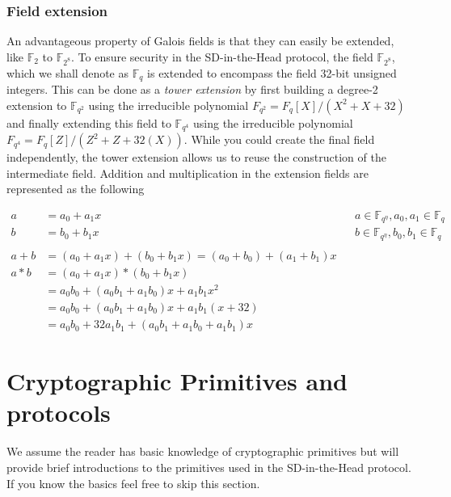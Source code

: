 \documentclass[twoside,11pt]{report}
\theoremstyle{definition}
\theoremstyle{plain}
\begin{document}
\subsubsection{Field extension}

An advantageous property of Galois fields is that they can easily be extended, like $\mathbb{F}_{2}$ to $\mathbb{F}_{2^8}$. To ensure security in the SD-in-the-Head protocol, the field $\mathbb{F}_{2^8}$, which we shall denote as $\mathbb{F}_q$ is extended to encompass the field 32-bit unsigned integers. This can be done as a \textit{tower extension} by first building a degree-2 extension to $\mathbb{F}_{q^2}$ using the irreducible polynomial $F_{q^2} = F_q[X] / (X^2 + X + 32)$ and finally extending this field to $\mathbb{F}_{q^4}$ using the irreducible polynomial $F_{q^4} = F_q[Z] / (Z^2 + Z + 32(X))$. While you could create the final field independently, the tower extension allows us to reuse the construction of the intermediate field. Addition and multiplication in the extension fields are represented as the following

\begin{align*}
  a     & = a_0 + a_1x                                               &  & a \in \mathbb{F}_{q^\eta}, a_0, a_1 \in \mathbb{F}_q \\
  b     & = b_0 + b_1x                                               &  & b \in \mathbb{F}_{q^\eta}, b_0, b_1 \in \mathbb{F}_q \\\\
  a + b & = (a_0 + a_1x) + (b_0 + b_1x) = (a_0 + b_0) + (a_1 + b_1)x                                                           \\
  a * b & = (a_0 + a_1x) * (b_0 + b_1x)                                                                                        \\
        & = a_0b_0 + (a_0b_1 + a_1b_0)x + a_1b_1x^2                                                                            \\
        & = a_0b_0 + (a_0b_1 + a_1b_0)x + a_1b_1(x + 32)                                                                       \\
        & = a_0b_0 + 32a_1b_1 + (a_0b_1 + a_1b_0 + a_1b_1)x
\end{align*}

\section{Cryptographic Primitives and protocols}
We assume the reader has basic knowledge of cryptographic primitives but will provide brief introductions to the primitives used in the SD-in-the-Head protocol. If you know the basics feel free to skip this section.
\end{document}
